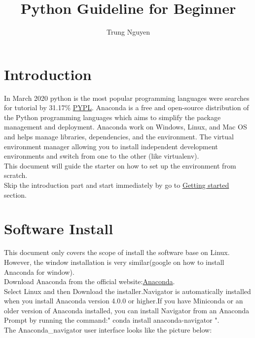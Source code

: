 \documentclass[a4paper,10pt]{article}
\title{Python Guideline for Beginner}
\author{Trung Nguyen}
\date{}
\begin{document}
\maketitle

\tableofcontents

\section{Introduction}

In March 2020 python is the most popular programming languages were searches for tutorial by 31.17\% \href{http://pypl.github.io/PYPL.html}{PYPL}\cite{PYPL}.\newline
Anaconda is a free and open-source distribution of the Python programming languages which aims to simplify the package management and deployment. Anaconda work on Windows, Linux, and Mac OS and helps manage libraries, dependencies, and the environment. The virtual environment manager allowing you to install independent development environments and switch from one to the other (like virtualenv).\\ 
This document will guide the starter on how to set up the environment from scratch.\\
Skip the introduction part and start immediately by go to \hyperref[sec:start]{Getting started} section.



\section{ Software Install}

This document only covers the scope of install the software base on Linux. However, the window installation is very similar(google on how to install Anaconda for window).\\
Download Anaconda from the official website:\href{https://www.anaconda.com/products/individual}{Anaconda}.\\
Select Linux and then Download the installer.Navigator is automatically installed when you install Anaconda version 4.0.0 or higher.If you have Miniconda or an older version of Anaconda installed, you can install Navigator from an Anaconda Prompt by running the command:" conda install anaconda-navigator ".\\
The Anaconda\_navigator user interface looks like the picture below:

\vspace{5mm}
\end{document}
